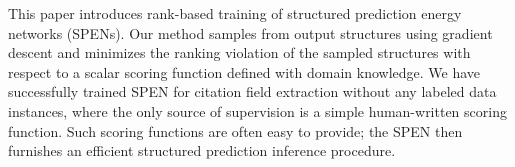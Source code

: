This paper introduces rank-based training of structured prediction energy networks (SPENs). Our method samples from output structures using gradient descent and minimizes the ranking violation of the sampled structures with respect to a scalar scoring function defined with domain knowledge. We have successfully trained SPEN for citation field extraction without any labeled data instances, where the only source of supervision is a simple human-written scoring function.  Such scoring functions are often easy to provide; the SPEN then furnishes an efficient structured prediction inference procedure.
